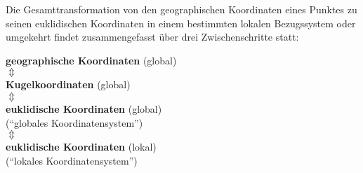 Die Gesamttransformation von den geographischen Koordinaten eines Punktes zu seinen euklidischen Koordinaten in einem bestimmten lokalen Bezugssystem oder umgekehrt findet zusammengefasst über drei Zwischenschritte statt:\kleinerabstand

\parbox{\textwidth}{\centering
	\textbf{geographische Koordinaten} (global)\\
	$\Updownarrow$\\
	\textbf{Kugelkoordinaten} (global)\\
	$\Updownarrow$\\
	\textbf{euklidische Koordinaten} (global)\\
	(``globales Koordinatensystem'')\\
	$\Updownarrow$\\
	\textbf{euklidische Koordinaten} (lokal)\\
	(``lokales Koordinatensystem'')
}
